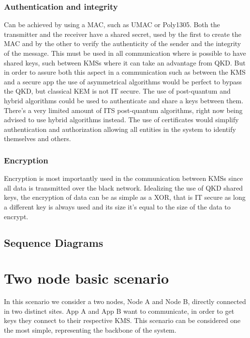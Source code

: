\begin{refsection}
\subsubsection{Authentication and integrity}
Can be achieved by using a \ac{MAC}, such as UMAC or Poly1305. Both the transmitter and the receiver have a shared secret, used by the first to create the \ac{MAC} and by the other to verify the authenticity of the sender and the integrity of the message. This must be used in all communication where is possible to have shared keys, such between KMSs where it can take an advantage from QKD. But in order to assure both this aspect in a communication such as between the KMS and a secure app the use of asymmetrical algorithms would be perfect to bypass the QKD, but classical \ac{KEM} is not IT secure. The use of post-quantum and hybrid algorithms could be used to authenticate and share a keys between them. There's a very limited amount of \ac{ITS} post-quantum algorithms, right now being advised to use hybrid algorithms instead. The use of certificates would simplify authentication and authorization allowing all entities in the system to identify themselves and others.

\subsubsection{Encryption}
Encryption is most importantly used in the communication between KMSs since all data is transmitted over the black network. Idealizing the use of QKD shared keys, the encryption of data can be as simple as a XOR, that is IT secure as long a different key is always used and its size it's equal to the size of the data to encrypt.



\subsection{Sequence Diagrams}
\label{seq_diagrams}

\section{Two node basic scenario}

In this scenario we consider a two nodes, Node A and Node B, directly connected in two distinct sites. App A and App B want to communicate, in order to get keys they connect to their respective \ac{KMS}. This scenario can be considered one the most simple, representing the backbone of the system.


\end{refsection}
